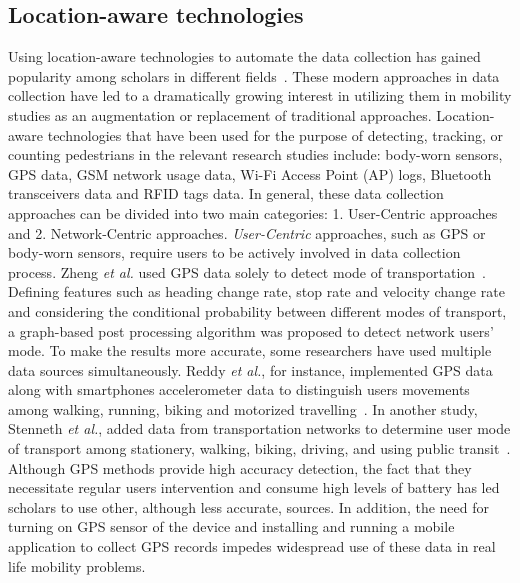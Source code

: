 \subsection{Location-aware technologies}
Using location-aware technologies to automate the data collection has gained popularity among scholars in different fields~\cite{farooq2015ubiquitous}. These modern approaches in data collection have led to a dramatically growing interest in utilizing them in mobility studies as an augmentation or replacement of traditional approaches. Location-aware technologies that have been used for the purpose of detecting, tracking, or counting pedestrians in the relevant research studies include: body-worn sensors, GPS data, GSM network usage data, Wi-Fi Access Point (AP) logs, Bluetooth transceivers data and RFID tags data. In general, these data collection approaches can be divided into two main categories: 1. User-Centric approaches and 2. Network-Centric approaches. \emph{User-Centric} approaches, such as GPS or body-worn sensors, require users to be actively involved in data collection process. Zheng \textit{et al.} used GPS data solely to detect mode of transportation~\cite{zheng2008understanding}. Defining features such as heading change rate, stop rate and velocity change rate and considering the conditional probability between different modes of transport, a graph-based post processing algorithm was proposed to detect network users' mode. To make the results more accurate, some researchers have used multiple data sources simultaneously. Reddy \textit{et al.}, for instance, implemented GPS data along with smartphones accelerometer data to distinguish users movements among walking, running, biking and motorized travelling~\cite{reddy2008determining}. In another study, Stenneth \textit{et al.}, added data from transportation networks to determine user mode of transport among stationery, walking, biking, driving, and using public transit~\cite{stenneth2011transportation}. Although GPS methods provide high accuracy detection, the fact that they necessitate regular users intervention and consume high levels of battery has led scholars to use other, although less accurate, sources. In addition, the need for turning on GPS sensor of the device and installing and running a mobile application to collect GPS records impedes widespread use of these data in real life mobility problems.

